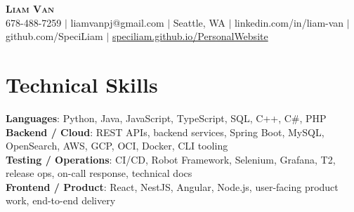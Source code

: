 \documentclass[letterpaper,11pt]{article}
\begin{document}

%
\begin{center}
    \textbf{\Huge \scshape Liam Van} \\ \vspace{1pt}
    \small 678-488-7259 $|$ \small {liamvanpj@gmail.com} $|$ Seattle, WA
 {{$|$ linkedin.com/in/liam-van} {$|$ github.com/SpeciLiam} {$|$ \href{https://speciliam.github.io/PersonalWebsite}{speciliam.github.io/PersonalWebsite}}}

\end{center}

\section{Technical Skills}
 \begin{itemize}[leftmargin=0.15in, label={}]
    \small{\item{
     \textbf{Languages}{: Python, Java, JavaScript, TypeScript, SQL, C++, C\#, PHP} \\
     \textbf{Backend / Cloud}{: REST APIs, backend services, Spring Boot, MySQL, OpenSearch, AWS, GCP, OCI, Docker, CLI tooling} \\
     \textbf{Testing / Operations}{: CI/CD, Robot Framework, Selenium, Grafana, T2, release ops, on-call response, technical docs} \\
     \textbf{Frontend / Product}{: React, NestJS, Angular, Node.js, user-facing product work, end-to-end delivery} \\
    }}
 \end{itemize}
%
\end{document}
